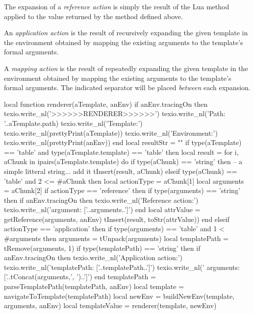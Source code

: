 {{The expansion of a \emph{reference action} is simply the result of the Lua 
 method applied to the value returned by the 
 method defined above. 

An \emph{application action} is the result of recursively expanding the 
given template in the environment obtained by mapping the existing 
arguments to the template's formal arguments. 

A \emph{mapping action} is the result of repeatedly expanding the given 
template in the environment obtained by mapping the existing arguments to 
the template's formal arguments. The indicated separator will be placed 
\emph{between} each expansion. 

\startLuaCode
local function renderer(aTemplate, anEnv)
  if anEnv.tracingOn then
    texio.write_nl('>>>>>>RENDERER>>>>>>')
    texio.write_nl('Path: '..aTemplate.path)
    texio.write_nl('Template:')
    texio.write_nl(prettyPrint(aTemplate))
    texio.write_nl('Environment:')
    texio.write_nl(prettyPrint(anEnv))
  end
  local resultStr = ""
  if type(aTemplate) == 'table' and
     type(aTemplate.template) == 'table' then
    local result = { }
    for i, aChunk in ipairs(aTemplate.template) do
      if type(aChunk) == 'string' then
        -- a simple litteral string... add it
        tInsert(result, aChunk)
      elseif type(aChunk) == 'table' and 2 <= #aChunk then
        local actionType = aChunk[1]
        local arguments  = aChunk[2]
        if actionType == 'reference' then
          if type(arguments) == 'string' then
            if anEnv.tracingOn then
              texio.write_nl('Reference action:')
              texio.write_nl('argument: ['..arguments..']')
            end
            local attrValue = getReference(arguments, anEnv)
            tInsert(result, toStr(attrValue))
          end
        elseif actionType == 'application' then
          if type(arguments) == 'table' and 1 < #arguments then
            arguments = { tUnpack(arguments) }
            local templatePath = tRemove(arguments, 1)
            if type(templatePath) == 'string' then
              if anEnv.tracingOn then
                texio.write_nl('Application action:')
                texio.write_nl('templatePath: ['..templatePath..']')
                texio.write_nl('   arguments: ['..tConcat(arguments,', ')..']')
              end
              templatePath   = parseTemplatePath(templatePath, anEnv)
              local template = navigateToTemplate(templatePath)
              local newEnv   = buildNewEnv(template, arguments, anEnv)
              local templateValue = renderer(template, newEnv)
}}
